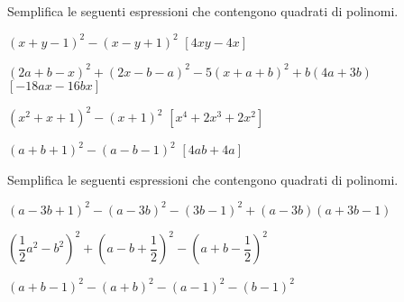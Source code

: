 \begin{esercizio}
\begin{enumeratea}
\end{enumeratea}
\end{esercizio}

\begin{esercizio}[\Ast]
 \label{ese:11.14}
Semplifica le seguenti espressioni che contengono quadrati di polinomi.

\begin{enumeratea}
 \item \((x+y-1)^{2}-(x-y+1)^{2}\)
  \hfill \(\left[4{xy}-4x\right]\)
\item \((2a+b-x)^{2}+(2x-b-a)^{2}-5(x+a+b)^{2}+b(4a+3b)\)
  \hfill \(\left[-18ax-16bx\right]\)
\item \(\left(x^{2}+x+1\right)^{2}-(x+1)^{2}\)
  \hfill \(\left[x^{4}+2x^{3}+2x^{2}\right]\)
\item \((a+b+1)^{2}-(a-b-1)^{2}\)
  \hfill \(\left[4ab+4a\right]\)
\end{enumeratea}
\end{esercizio}

\begin{esercizio}
 \label{ese:11.15}
Semplifica le seguenti espressioni che contengono quadrati di polinomi.

\begin{enumeratea}
 \item \((a-3b+1)^{2}-(a-3b)^{2}-(3b-1)^{2}+(a-3b)(a+3b-1)\)
\item 
\(\left(\dfrac{1}{2}a^{2}-b^{2}\right)^{2}+\left(a-b+\dfrac{1}{2}\right)^{2}
-\left(a+b-\dfrac{1}{2}\right)^{2}\)
\item \((a+b-1)^{2}-(a+b)^{2}-(a-1)^{2}-(b-1)^{2}\)
\end{enumeratea}
\end{esercizio}

